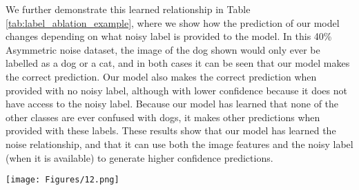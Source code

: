 \documentclass[10pt,twocolumn,letterpaper]{article}
\begin{document}
We further demonstrate this learned relationship in Table \ref{tab:label_ablation_example}, where we show how the prediction of our model changes depending on what noisy label is provided to the model. In this 40\% Asymmetric noise dataset, the image of the dog shown would only ever be labelled as a dog or a cat, and in both cases it can be seen that our model makes the correct prediction. Our model also makes the correct prediction when provided with no noisy label, although with lower confidence because it does not have access to the noisy label. Because our model has learned that none of the other classes are ever confused with dogs, it makes other predictions when provided with these labels. These results show that our model has learned the noise relationship, and that it can use both the image features and the noisy label (when it is available) to generate higher confidence predictions.

\begin{table}[t!]
    \begin{center}
    \begin{minipage}{.25\columnwidth}
        \centering
        \texttt{[image: Figures/12.png]}
    \end{minipage}
    \begin{minipage}{.6\columnwidth}
        \centering
    \end{minipage}
    \end{center}
    \caption{Predictions made by our model with different noisy labels for a testing sample (showing a dog) in Asym 0.4 noise for CIFAR10. `-' represents using a null label in place of a noisy label.}
    \label{tab:label_ablation_example}
\end{table}
\end{document}
